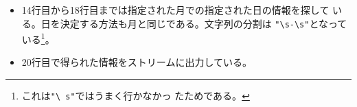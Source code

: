 \documentclass[dvipsk]{beamer}
\begin{document}
\begin{frame}[containsverbatim]
\frametitle{}
\begin{itemize}
 \item 14行目から18行目までは指定された月での指定された日の情報を探して
       いる。日を決定する方法も月と同じである。文字列の分割は
       \verb+"\s-\s"+となっている\footnote{これは\texttt{"\textbackslash
       s"}ではうまく行かなかっ
       たためである。}。
 \item 20行目で得られた情報をストリームに出力している。
\end{itemize}
\end{frame}
\end{document}
